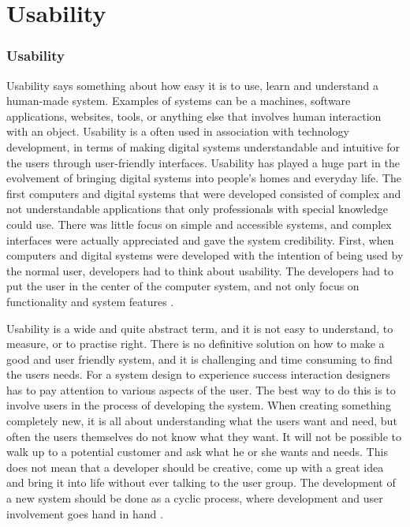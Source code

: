 \chapter{Usability}
\subsection{Usability}
Usability says something about how easy it is to use, learn and understand a human-made system. Examples of systems can be a machines, software applications, websites, tools, or anything else that involves human interaction with an object. Usability is a often used in association with technology development, in terms of making digital systems understandable and intuitive for the users through user-friendly interfaces. Usability has played a huge part in the evolvement of bringing digital systems into people’s homes and everyday life. The first computers and digital systems that were developed consisted of complex and not understandable applications that only professionals with special knowledge could use. There was little focus on simple and accessible systems, and complex interfaces were actually appreciated and gave the system credibility. First, when computers and digital systems were developed with the intention of being used by the normal user, developers had to think about usability. The developers had to put the user in the center of the computer system, and not only focus on functionality and system features \cite{mmi}.

Usability is a wide and quite abstract term, and it is not easy to understand, to measure, or to practise right. There is no definitive solution on how to make a good and user friendly system, and it is challenging and time consuming to find the users needs. For a system design to experience success interaction designers has to pay attention to various aspects of the user. The best way to do this is to involve users in the process of developing the system. When creating something completely new, it is all about understanding what the users want and need, but often the users themselves do not know what they want. It will not be possible to walk up to a potential customer and ask what he or she wants and needs. This does not mean that a developer should be creative, come up with a great idea and bring it into life without ever talking to the user group. The development of a new system should be done as a cyclic process, where development and user involvement goes hand in hand \cite{mmi}.  

